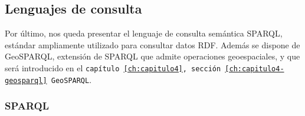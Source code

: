 \subsection{Lenguajes de consulta}


Por último, nos queda presentar el lenguaje de consulta semántica SPARQL, estándar ampliamente utilizado para consultar datos RDF. Además se dispone de GeoSPARQL, extensión de SPARQL que admite operaciones geoespaciales, y que será introducido en el \texttt{capítulo \ref{ch:capitulo4}, sección \ref{ch:capitulo4-geosparql} GeoSPARQL}.


\subsubsection{SPARQL}




